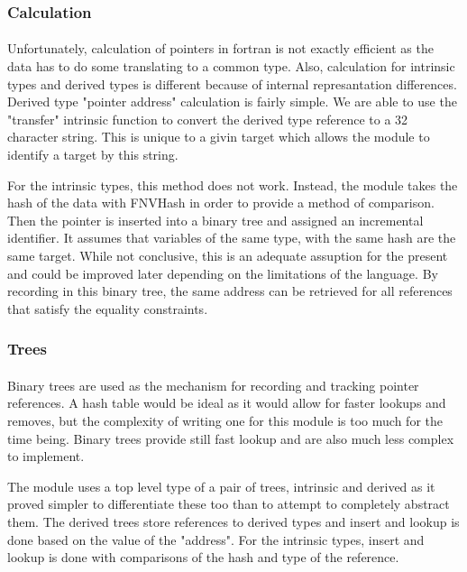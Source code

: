\documentclass{article}
\begin{document}
\subsubsection{Calculation}
\paragraph{}
Unfortunately, calculation of pointers in fortran is not exactly efficient as the data has to do some translating to a common type. Also, calculation for intrinsic types and derived types is different because of internal represantation differences. Derived type "pointer address" calculation is fairly simple. We are able to use the "transfer" intrinsic function to convert the derived type reference to a 32 character string. This is unique to a givin target which allows the module to identify a target by this string. 

For the intrinsic types, this method does not work. Instead, the module takes the hash of the data with FNVHash in order to provide a method of comparison. Then the pointer is inserted into a binary tree and assigned an incremental identifier. It assumes that variables of the same type, with the same hash are the same target. While not conclusive, this is an adequate assuption for the present and could be improved later depending on the limitations of the language. By recording in this binary tree, the same address can be retrieved for all references that satisfy the equality constraints.

\subsubsection{Trees}
\paragraph{}
Binary trees are used as the mechanism for recording and tracking pointer references. A hash table would be ideal as it would allow for faster lookups and removes, but the complexity of writing one for this module is too much for the time being. Binary trees provide still fast lookup and are also much less complex to implement.

The module uses a top level type of a pair of trees, intrinsic and derived as it proved simpler to differentiate these too than to attempt to completely abstract them. The derived trees store references to derived types and insert and lookup is done based on the value of the "address". For the intrinsic types, insert and lookup is done with comparisons of the hash and type of the reference.
\end{document}

